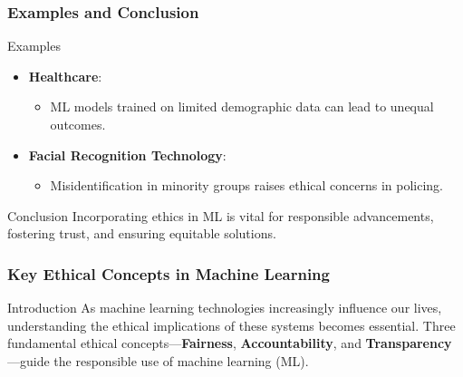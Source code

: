 \documentclass[aspectratio=169]{beamer}
\begin{document}
\begin{frame}[fragile]
    \frametitle{Examples and Conclusion}
    \begin{block}{Examples}
        \begin{itemize}
            \item \textbf{Healthcare}:
                \begin{itemize}
                    \item ML models trained on limited demographic data can lead to unequal outcomes.
                \end{itemize}
            \item \textbf{Facial Recognition Technology}:
                \begin{itemize}
                    \item Misidentification in minority groups raises ethical concerns in policing.
                \end{itemize}
        \end{itemize}
    \end{block}
    \begin{block}{Conclusion}
        Incorporating ethics in ML is vital for responsible advancements, fostering trust, and ensuring equitable solutions.
    \end{block}
\end{frame}

\begin{frame}[fragile]
    \frametitle{Key Ethical Concepts in Machine Learning}
    \begin{block}{Introduction}
        As machine learning technologies increasingly influence our lives, understanding the ethical implications of these systems becomes essential. Three fundamental ethical concepts—\textbf{Fairness}, \textbf{Accountability}, and \textbf{Transparency}—guide the responsible use of machine learning (ML).
    \end{block}
\end{frame}
\end{document}
